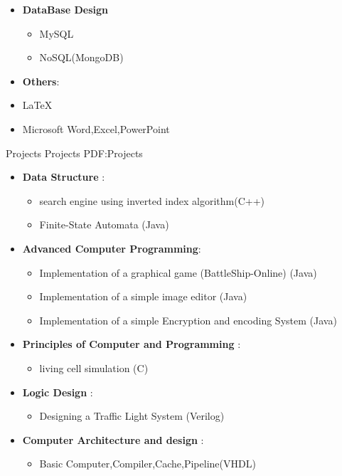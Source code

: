 \documentclass[letterpaper,MMMyyyy,nonstopmode]{simpleresumecv}
\begin{document}
\begin{Body}
\begin{itemize}
\item \textbf {DataBase Design}
\begin{itemize}
     \item MySQL
     \item NoSQL(MongoDB)

\end{itemize}


 \item \textbf{Others}: 
\item{\LaTeX}
\item Microsoft Word,Excel,PowerPoint

\end{itemize}







\Section
{Projects}
{Projects}
{PDF:Projects}

\Entry
\begin{itemize}
	\item \textbf{Data Structure} :
		\begin{itemize}
		\item	search engine using inverted index algorithm(C++)
	     \item   Finite-State Automata (Java)
		\end{itemize}
		
	\item \textbf{Advanced Computer Programming}:
		\begin{itemize}
		\item  Implementation of a graphical game (BattleShip-Online) (Java)
     	\item Implementation of a simple image editor (Java)
	    \item Implementation of a simple Encryption and encoding System  (Java)
		\end{itemize}
		
	\item \textbf{Principles of Computer and Programming }: 
		\begin{itemize}
	    \item  living cell simulation (C)
	      	\end{itemize}
   	\item \textbf{Logic Design} : 
   		\begin{itemize}
     \item	Designing a Traffic Light System (Verilog)
     		\end{itemize}
   	\item \textbf{Computer Architecture and design} :
   		\begin{itemize}
		\item Basic Computer,Compiler,Cache,Pipeline(VHDL)
		\end{itemize}
		

\end{itemize}
\end{Body}
\end{document}
